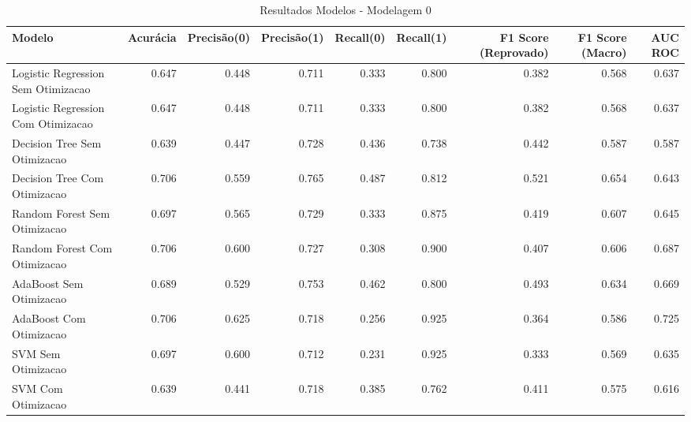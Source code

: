 \begin{table}[H] %
    \centering
    \caption{Resultados Modelos - Modelagem 0}
    \label{tab:resultados_modelagem_0}
    \renewcommand{\arraystretch}{1.25} %
    \begin{adjustwidth}{ -1in }{ -1in } %
    \centering %
    \small %
    \begin{tabular}{lrrrrrrrr}
\toprule
                            Modelo &  Acurácia &  Precisão(0) &  Precisão(1) &  Recall(0) &  Recall(1) &  F1 Score (Reprovado) &  F1 Score (Macro) &  AUC ROC \\
\midrule
Logistic Regression Sem Otimizacao &     0.647 &        0.448 &        0.711 &      0.333 &      0.800 &                 0.382 &             0.568 &    0.637 \\
Logistic Regression Com Otimizacao &     0.647 &        0.448 &        0.711 &      0.333 &      0.800 &                 0.382 &             0.568 &    0.637 \\
      Decision Tree Sem Otimizacao &     0.639 &        0.447 &        0.728 &      0.436 &      0.738 &                 0.442 &             0.587 &    0.587 \\
      Decision Tree Com Otimizacao &     0.706 &        0.559 &        0.765 &      0.487 &      0.812 &                 0.521 &             0.654 &    0.643 \\
      Random Forest Sem Otimizacao &     0.697 &        0.565 &        0.729 &      0.333 &      0.875 &                 0.419 &             0.607 &    0.645 \\
      Random Forest Com Otimizacao &     0.706 &        0.600 &        0.727 &      0.308 &      0.900 &                 0.407 &             0.606 &    0.687 \\
           AdaBoost Sem Otimizacao &     0.689 &        0.529 &        0.753 &      0.462 &      0.800 &                 0.493 &             0.634 &    0.669 \\
           AdaBoost Com Otimizacao &     0.706 &        0.625 &        0.718 &      0.256 &      0.925 &                 0.364 &             0.586 &    0.725 \\
                SVM Sem Otimizacao &     0.697 &        0.600 &        0.712 &      0.231 &      0.925 &                 0.333 &             0.569 &    0.635 \\
                SVM Com Otimizacao &     0.639 &        0.441 &        0.718 &      0.385 &      0.762 &                 0.411 &             0.575 &    0.616 \\
\bottomrule
\end{tabular}
    \end{adjustwidth}
    \renewcommand{\arraystretch}{1.0} %
\end{table}
